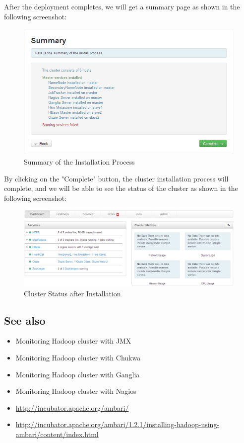 
After the deployment completes, we will get a summary page as shown in the following screenshot:
\begin{figure}[h]
  \centering
  \includegraphics[width=.8\textwidth]{figs/5163os_06_26.png}
  \caption{Summary of the Installation Process}\label{fig:install.summary}
\end{figure} 


By clicking on the "Complete" button, the cluster installation process will complete, and we will be able to see the status of the cluster as shown in the following screenshot:
\begin{figure}[h]
  \centering
  \includegraphics[width=.8\textwidth]{figs/5163os_06_27.png}
  \caption{Cluster Status after Installation}\label{fig:cluster.status}
\end{figure} 

\subsection*{See also}
\begin{itemize}
  \item Monitoring Hadoop cluster with JMX
  \item Monitoring Hadoop cluster with Chukwa 
  \item Monitoring Hadoop cluster with Ganglia
  \item Monitoring Hadoop cluster with Nagios
  \item \url{http://incubator.apache.org/ambari/}
  \item \url{http://incubator.apache.org/ambari/1.2.1/installing-hadoop-using-ambari/content/index.html}
\end{itemize}

